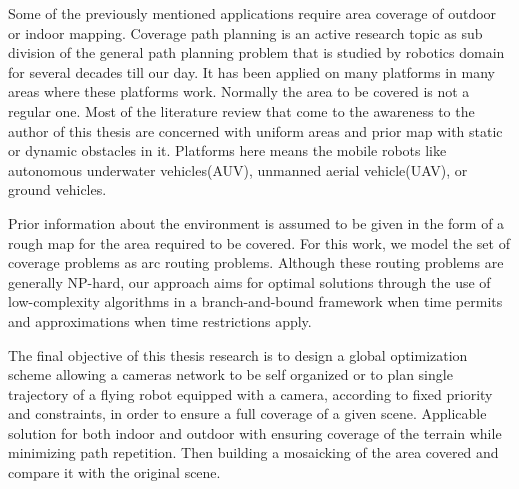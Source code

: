 
Some of the previously mentioned applications require area coverage of outdoor or indoor mapping. Coverage path planning is an active research topic as sub division of the general path planning problem that is studied by robotics domain for several decades till our day. It has been applied on many platforms in many areas where these platforms work. Normally the area to be covered is not a regular one. Most of the literature review that come to the awareness to the author of this thesis are concerned with uniform areas and prior map with static or dynamic obstacles in it. Platforms here means the mobile robots like autonomous underwater vehicles(AUV), unmanned aerial vehicle(UAV), or ground vehicles. 


Prior information about the environment is assumed to be given in the form of a rough map for the area required to be covered. For this work, we model the set of coverage problems as arc routing problems. Although these routing problems are generally NP-hard, our approach aims for optimal solutions through the use of low-complexity algorithms in a branch-and-bound framework when time permits and approximations when time restrictions apply.


The final objective of this thesis research is to design a global optimization scheme allowing a cameras network to be self organized or to plan single trajectory of a flying robot equipped with a camera, according to fixed priority and constraints, in order to ensure a full coverage of a given scene. Applicable solution for both indoor and outdoor with ensuring coverage of the terrain while minimizing path repetition. Then building a mosaicking of the area covered and compare it with the original scene.



